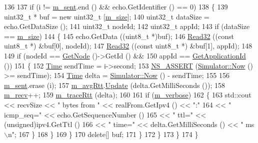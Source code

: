 \begin{DoxyCode}
136 
137           \textcolor{keywordflow}{if} (i != \hyperlink{classns3_1_1V4Ping_ad26f6eafcdbf6a787900a6c77099ef6e}{m\_sent}.end () && echo.GetIdentifier () == 0)
138             \{
139               uint32\_t * buf = \textcolor{keyword}{new} uint32\_t [\hyperlink{classns3_1_1V4Ping_a15214114a8580f6e7c56ad18267b2199}{m\_size}];
140               uint32\_t dataSize = echo.GetDataSize ();
141               uint32\_t nodeId;
142               uint32\_t appId;
143               \textcolor{keywordflow}{if} (dataSize == \hyperlink{classns3_1_1V4Ping_a15214114a8580f6e7c56ad18267b2199}{m\_size})
144                 \{
145                   echo.GetData ((uint8\_t *)buf);
146                   \hyperlink{classns3_1_1V4Ping_a00088be83cf04e08dd3c3a69ed4526d2}{Read32} ((\textcolor{keyword}{const} uint8\_t *) &buf[0], nodeId);
147                   \hyperlink{classns3_1_1V4Ping_a00088be83cf04e08dd3c3a69ed4526d2}{Read32} ((\textcolor{keyword}{const} uint8\_t *) &buf[1], appId);
148 
149                   \textcolor{keywordflow}{if} (nodeId == \hyperlink{classns3_1_1Application_a664b15088389bec8e35b35742138f097}{GetNode} ()->GetId () &&
150                       appId == \hyperlink{classns3_1_1V4Ping_a294b811c91221c31618d4cdcb389a96b}{GetApplicationId} ())
151                     \{
152                       \hyperlink{namespacens3_1_1TracedValueCallback_a7ffd3e7c142ffe7c8a1d2db9b8de38ec}{Time} sendTime = i->second;
153                       \hyperlink{assert_8h_a6dccdb0de9b252f60088ce281c49d052}{NS\_ASSERT} (\hyperlink{classns3_1_1Simulator_ac3178fa975b419f7875e7105be122800}{Simulator::Now} () >= sendTime);
154                       \hyperlink{namespacens3_1_1TracedValueCallback_a7ffd3e7c142ffe7c8a1d2db9b8de38ec}{Time} delta = \hyperlink{classns3_1_1Simulator_ac3178fa975b419f7875e7105be122800}{Simulator::Now} () - sendTime;
155 
156                       \hyperlink{classns3_1_1V4Ping_ad26f6eafcdbf6a787900a6c77099ef6e}{m\_sent}.erase (i);
157                       \hyperlink{classns3_1_1V4Ping_a03550e3b807e5fe961c2289749a45ba9}{m\_avgRtt}.\hyperlink{classns3_1_1Average_a223cb5172985f2cf4944488f4ac1186b}{Update} (delta.GetMilliSeconds ());
158                       \hyperlink{classns3_1_1V4Ping_a20b535b432481efa2e45d398de3080e1}{m\_recv}++;
159                       \hyperlink{classns3_1_1V4Ping_abaf5eec819058e81e958ae3dadb8fbe2}{m\_traceRtt} (delta);
160 
161                       \textcolor{keywordflow}{if} (\hyperlink{classns3_1_1V4Ping_a0b843e4454492e5a20860b6c624b667b}{m\_verbose})
162                         \{
163                           std::cout << recvSize << \textcolor{stringliteral}{" bytes from "} << realFrom.GetIpv4 () << \textcolor{stringliteral}{":"}
164                                     << \textcolor{stringliteral}{" icmp\_seq="} << echo.GetSequenceNumber ()
165                                     << \textcolor{stringliteral}{" ttl="} << (unsigned)ipv4.GetTtl ()
166                                     << \textcolor{stringliteral}{" time="} << delta.GetMilliSeconds () << \textcolor{stringliteral}{" ms\(\backslash\)n"};
167                         \}
168                     \}
169                 \}
170               \textcolor{keyword}{delete}[] buf;
171             \}
172         \}
173     \}
174 \}
\end{DoxyCode}


